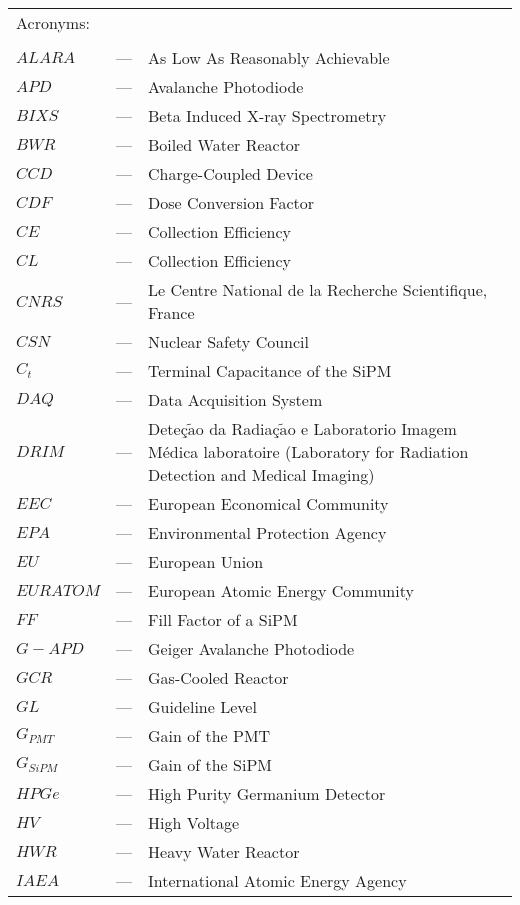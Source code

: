 \begin{longtable}{p{25mm} c p{120mm} }
\multicolumn{3}{l}{Acronyms:}\\
\\
$ALARA$ & --- & As Low As Reasonably Achievable\\
$APD$ & --- & Avalanche Photodiode\\
$BIXS$ & --- & Beta Induced X-ray Spectrometry\\
$BWR$ & --- & Boiled Water Reactor\\
$CCD$ & --- & Charge-Coupled Device\\
$CDF$ & --- & Dose Conversion Factor\\
$CE$ & --- & Collection Efficiency\\
$CL$ & --- & Collection Efficiency\\
$CNRS$ & --- & Le Centre National de la Recherche Scientifique, France\\
$CSN$ & --- & Nuclear Safety Council\\
$C_t$ & --- & Terminal Capacitance of the SiPM\\
$DAQ$ & --- & Data Acquisition System\\
$DRIM$ & --- & Deteç$\tilde{\text{a}}$o da Radiaç$\tilde{\text{a}}$o e Laboratorio Imagem Médica
\newline
laboratoire (Laboratory for Radiation Detection and 
\newline
Medical Imaging)\\
$EEC$ & --- & European Economical Community\\
$EPA$ & --- & Environmental Protection Agency\\
$EU$ & --- & European Union\\
$EURATOM$ & --- & European Atomic Energy Community\\
$FF$ & --- & Fill Factor of a SiPM\\
$G-APD$ & --- & Geiger Avalanche Photodiode\\
$GCR$ & --- & Gas-Cooled Reactor\\
$GL$ & --- & Guideline Level\\
$G_{PMT}$ & --- & Gain of the PMT\\
$G_{SiPM}$ & --- & Gain of the SiPM\\
$HPGe$ & --- & High Purity Germanium Detector\\
$HV$ & --- & High Voltage\\
$HWR$ & --- & Heavy Water Reactor\\
$IAEA$ & --- & International Atomic Energy Agency \\

\end{longtable}
